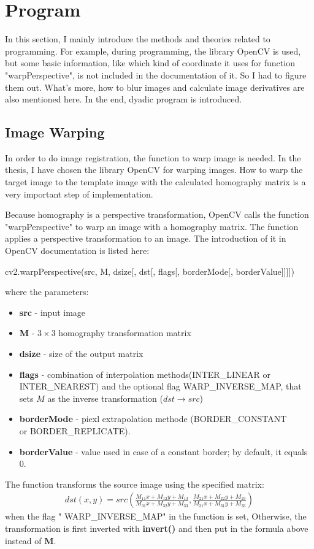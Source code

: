 \section{Program}\label{sec:Program}
In this section, I mainly introduce the methods and theories related to programming.  For example, during programming, the library OpenCV is used, but some basic information, like which kind of coordinate it uses for function "warpPerspective", is not included in the documentation of it. So I had to figure them out. What's more,  how to blur images and calculate image derivatives are also mentioned here.  In the end, dyadic program is introduced. 

\subsection{Image Warping}\label{subsec:Image Warping}
In order to do image registration, the function to warp image is needed. In the thesis, I have chosen the library OpenCV for warping images. How to warp the target image to the template image with the calculated homography matrix is a very important step of implementation.

Because homography is a perspective transformation, OpenCV calls the function "warpPerspective" to warp an image with a homography matrix. The function applies a perspective transformation to an image. The introduction of it in OpenCV documentation \cite{opencvdevteamOpenCV13Documentation} is listed here:
\begin{python}[caption={Model of warpPerspective},label={lst:model of warpPerspective}]
	cv2.warpPerspective(src, M, dsize[, dst[, flags[, borderMode[, borderValue]]]])
\end{python}
where
the parameters: 
\begin{itemize}
	\item \textbf{src} - input image
	\item \textbf{M} - $3 \times 3$ homography transformation matrix
	\item \textbf{dsize} - size of the output matrix
	\item \textbf{flags} - combination of interpolation methods(INTER\_LINEAR or INTER\_NEAREST) and the optional flag WARP\_INVERSE\_MAP, that sets $M$ as the inverse transformation ($ dst \rightarrow src $)
	\item \textbf{borderMode} - piexl extrapolation 
	methode (BORDER\_CONSTANT \\ or BORDER\_REPLICATE).
	\item \textbf{borderValue} - value used in case of a constant border; by default, it equals 0.
\end{itemize}
The function transforms the source image using the specified matrix:
\begin{align}
	dst(x, y) = src\left( \frac{M_{11}x + M_{12}y+ M_{13}}{M_{31}x+M_{32}y + M_{33}}, \frac{M_{21}x + M_{22}y + M_{23}}{M_{31}x + M_{31}y + M_{33}} \right)
\end{align}
when the flag "	WARP\_INVERSE\_MAP" in the function is set, Otherwise, the transformation is first inverted with \textbf{invert()} and then put in the formula above instead of \textbf{M}. 

